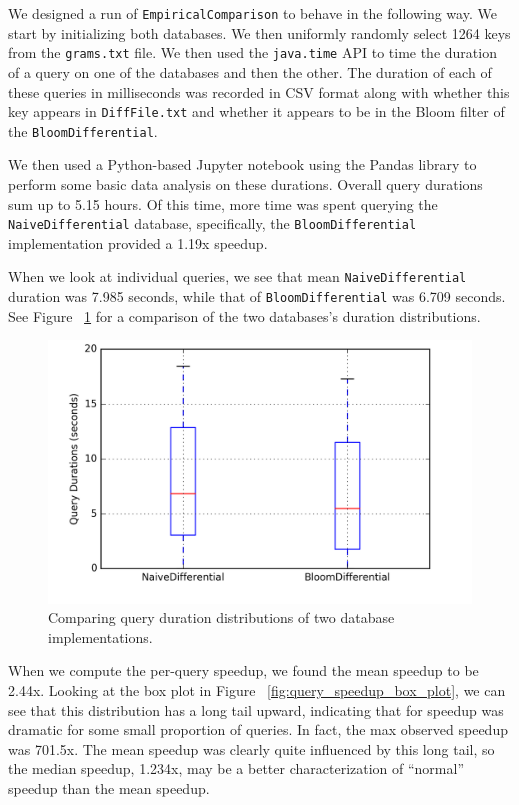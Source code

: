 \documentclass{article}
\begin{document}
We designed a run of \texttt{EmpiricalComparison} to behave in the following
way. We start by initializing both databases. We then uniformly randomly select
1264 keys from the \texttt{grams.txt} file. We then used the \texttt{java.time}
API to time the duration of a query on one of the databases and then the other.
The duration of each of these queries in milliseconds was recorded in CSV format
along with whether this key appears in \texttt{DiffFile.txt} and whether it
appears to be in the Bloom filter of the \texttt{BloomDifferential}.

We then used a Python-based Jupyter notebook using the Pandas library to perform
some basic data analysis on these durations. Overall query durations sum up to
5.15 hours. Of this time, more time was spent querying the
\texttt{NaiveDifferential} database, specifically, the
\texttt{BloomDifferential} implementation provided a 1.19x speedup.

When we look at individual queries, we see that mean \texttt{NaiveDifferential}
duration was 7.985 seconds, while that of \texttt{BloomDifferential} was 6.709
seconds. See Figure ~\ref{fig:query_duration_box_plot} for a comparison of the
two databases's duration distributions.

\begin{figure}[h]
  \includegraphics[width=\textwidth]{figures/empirical_comparison/query_duration_box_plot.png}
  \caption{Comparing query duration distributions of two database
           implementations.}
  \label{fig:query_duration_box_plot}
\end{figure}

When we compute the per-query speedup, we found the mean speedup to be 2.44x.
Looking at the box plot in Figure ~\ref{fig:query_speedup_box_plot}, we can see
that this distribution has a long tail upward, indicating that for speedup was
dramatic for some small proportion of queries. In fact, the max observed speedup
was 701.5x. The mean speedup was clearly quite influenced by this long tail, so
the median speedup, 1.234x, may be a better characterization of ``normal''
speedup than the mean speedup.
\end{document}
